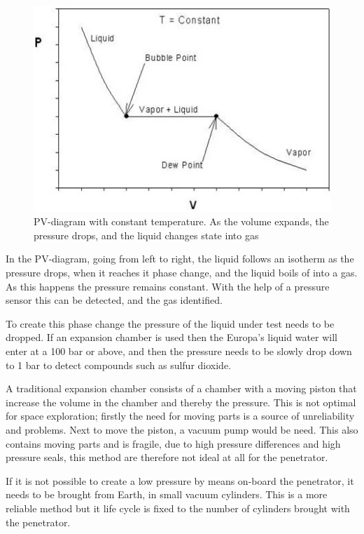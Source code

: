 \begin{figure}[htb]
  \centering
  \includegraphics[scale=1]{figures/GasDetectionAgge/PVdiagram}
  \caption{PV-diagram with constant temperature. As the volume expands, the pressure drops, and the liquid changes state into gas}
  \label{fig:PVdiagram}
\end{figure}

In the PV-diagram, going from left to right, the liquid follows an isotherm as the pressure drops, when it reaches it phase change, and the liquid boils of into a gas. As this happens the pressure remains constant. With the help of a pressure sensor this can be detected, and the gas identified.

To create this phase change the pressure of the liquid under test needs to be dropped. If an expansion chamber is used then the Europa's liquid water will enter at a 100 bar or above, and then the pressure needs to be slowly drop down to 1 bar to detect compounds such as sulfur dioxide.

A traditional expansion chamber consists of a chamber with a moving piston that increase the volume in the chamber and thereby the pressure. This is not optimal for space exploration; firstly the need for moving parts is a source of unreliability and problems. Next to move the piston, a vacuum pump would be need. This also contains moving parts and is fragile, due to high pressure differences and high pressure seals, this method are therefore not ideal at all for the penetrator.

If it is not possible to create a low pressure by means on-board the penetrator, it needs to be brought from Earth, in small vacuum cylinders. This is a more reliable method but it life cycle is fixed to the number of cylinders brought with the penetrator.

